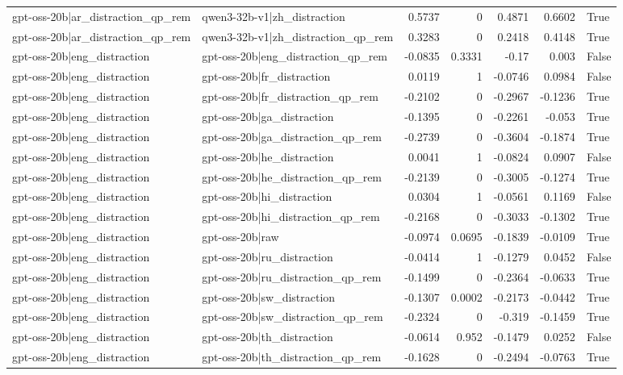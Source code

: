 \begin{table}
\begin{tabular}{l l r r r r l}
gpt-oss-20b|ar_distraction_qp_rem & qwen3-32b-v1|zh_distraction & 0.5737 & 0 & 0.4871 & 0.6602 & True \\
gpt-oss-20b|ar_distraction_qp_rem & qwen3-32b-v1|zh_distraction_qp_rem & 0.3283 & 0 & 0.2418 & 0.4148 & True \\
gpt-oss-20b|eng_distraction & gpt-oss-20b|eng_distraction_qp_rem & -0.0835 & 0.3331 & -0.17 & 0.003 & False \\
gpt-oss-20b|eng_distraction & gpt-oss-20b|fr_distraction & 0.0119 & 1 & -0.0746 & 0.0984 & False \\
gpt-oss-20b|eng_distraction & gpt-oss-20b|fr_distraction_qp_rem & -0.2102 & 0 & -0.2967 & -0.1236 & True \\
gpt-oss-20b|eng_distraction & gpt-oss-20b|ga_distraction & -0.1395 & 0 & -0.2261 & -0.053 & True \\
gpt-oss-20b|eng_distraction & gpt-oss-20b|ga_distraction_qp_rem & -0.2739 & 0 & -0.3604 & -0.1874 & True \\
gpt-oss-20b|eng_distraction & gpt-oss-20b|he_distraction & 0.0041 & 1 & -0.0824 & 0.0907 & False \\
gpt-oss-20b|eng_distraction & gpt-oss-20b|he_distraction_qp_rem & -0.2139 & 0 & -0.3005 & -0.1274 & True \\
gpt-oss-20b|eng_distraction & gpt-oss-20b|hi_distraction & 0.0304 & 1 & -0.0561 & 0.1169 & False \\
gpt-oss-20b|eng_distraction & gpt-oss-20b|hi_distraction_qp_rem & -0.2168 & 0 & -0.3033 & -0.1302 & True \\
gpt-oss-20b|eng_distraction & gpt-oss-20b|raw & -0.0974 & 0.0695 & -0.1839 & -0.0109 & True \\
gpt-oss-20b|eng_distraction & gpt-oss-20b|ru_distraction & -0.0414 & 1 & -0.1279 & 0.0452 & False \\
gpt-oss-20b|eng_distraction & gpt-oss-20b|ru_distraction_qp_rem & -0.1499 & 0 & -0.2364 & -0.0633 & True \\
gpt-oss-20b|eng_distraction & gpt-oss-20b|sw_distraction & -0.1307 & 0.0002 & -0.2173 & -0.0442 & True \\
gpt-oss-20b|eng_distraction & gpt-oss-20b|sw_distraction_qp_rem & -0.2324 & 0 & -0.319 & -0.1459 & True \\
gpt-oss-20b|eng_distraction & gpt-oss-20b|th_distraction & -0.0614 & 0.952 & -0.1479 & 0.0252 & False \\
gpt-oss-20b|eng_distraction & gpt-oss-20b|th_distraction_qp_rem & -0.1628 & 0 & -0.2494 & -0.0763 & True \\

\end{tabular}
\end{table}

